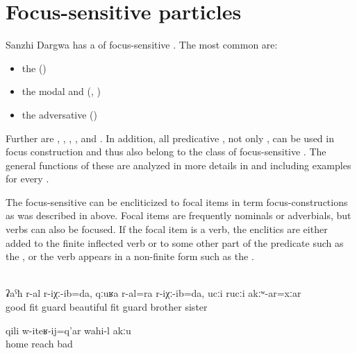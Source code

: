 
\section{Focus-sensitive particles}
\label{sec:Focus-sensitive particles}

Sanzhi Dargwa has a  of focus-sensitive . The most common  are:
%
\begin{itemize}
	\item	the    ()
	\item	the modal   and  (, )
	\item	the adversative   ()
\end{itemize}

Further  are  ,  ,  ,  , and  . In addition, all predicative , not only , can be used in focus construction and thus also belong to the class of focus-sensitive . The general functions of these  are analyzed in more details in  and  including examples for every .

The focus-sensitive  can be encliticized to focal items in term focus-constructions as was described in  above. Focal items are frequently nominals or adverbials, but verbs can also be focused. If the focal item is a verb, the enclitics are either added to the finite inflected verb or to some other part of the predicate such as the  , or the verb appears in a non-finite form such as the  .
%
\begin{exe}
	\\\label{ex:He guarded me well, he also guarded me safely, although without brothers and sisters}%
	\gll	ʡaˁħ	r-al	r-iχː-ib=da,	qːuʁa	r-al=ra	r-iχː-ib=da, ucːi	rucːi	akːʷ-ar=xːar\\
		good	\tsc{f-}fit	guard	beautiful	\tsc{f-}fit	guard brother	sister	\\
	\glt	{}

	\ex	\label{ex:‎Coming home is not bad}
	\gll	qili	w-iteʁ-ij=q'ar	wahi-l	akːu\\
		home	reach	bad	\\
	\glt	{}
\end{exe}

